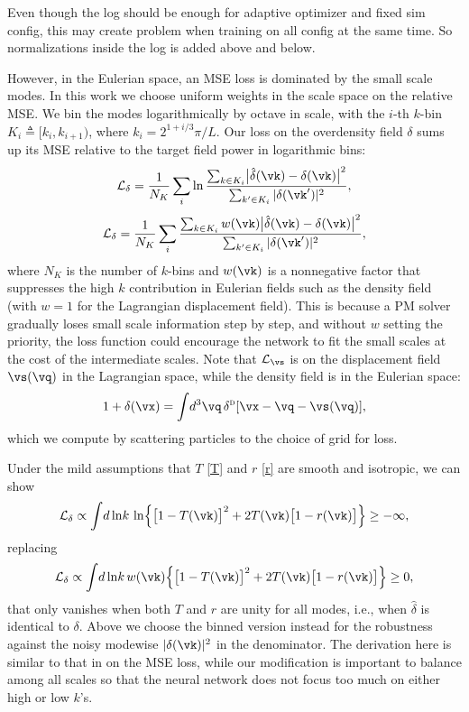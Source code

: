 \documentclass[modern, trackchanges, dvipsnames]{aastex631}
\newcommand{\deltaD}{\delta^\textsc{d}}
\renewcommand{\d}{d}
\newcommand{\cL}{\mathcal{L}}
\newcommand{\YL}[1]{\textcolor{Bittersweet}{#1}}
\begin{document}
\YL{Even though the log should be enough for adaptive optimizer and
fixed sim config, this may create problem when training on all config at
the same time. So normalizations inside the log is added above and
below.}

However, in the Eulerian space, an MSE loss is dominated by the small
scale modes.
In this work we choose uniform weights in the scale space on the
relative MSE.
We bin the modes logarithmically by  octave in scale, with
the $i$-th $k$-bin $K_i \triangleq [k_i, k_{i+1})$, where $k_i =
2^{1+i/3} \pi / L$.
Our loss on the overdensity field $\delta$ sums up its MSE relative to
the target field power in logarithmic bins:
%
\begin{equation}
\cL_\delta = \frac1{N_K} \sum_i \ln
\frac{\sum_{k \in K_i} \bigl| \hat\delta(\vk) - \delta(\vk) \bigr|^2}
     {\sum_{k' \in K_i} |\delta(\vk')|^2},
\end{equation}
%
\begin{equation}
\cL_\delta = \frac1{N_K} \sum_i
\frac{\sum_{k \in K_i} w(\vk)
      \bigl| \hat\delta(\vk) - \delta(\vk) \bigr|^2}
     {\sum_{k' \in K_i} |\delta(\vk')|^2},
\end{equation}
%
where $N_K$ is the number of $k$-bins and $w(\vk)$ is a nonnegative
factor that suppresses the high $k$ contribution in Eulerian fields such
as the density field (with $w=1$ for the Lagrangian displacement field).
This is because a PM solver gradually loses small scale information step
by step, and without $w$ setting the priority, the loss function could
encourage the network to fit the small scales at the cost of the
intermediate scales.
Note that $\cL_\vs$ is on the displacement field $\vs(\vq)$ in the
Lagrangian space, while the density field is in the Eulerian space:
%
\begin{equation}
1 + \delta(\vx) = \int\!\d^3\vq\, \deltaD[ \vx - \vq - \vs(\vq)],
\end{equation}
%
which we compute by scattering particles to the choice of grid for loss.

Under the mild assumptions that $T$ \eqref{T} and $r$ \eqref{r} are smooth
and isotropic, we can show
%
\begin{equation}
\cL_\delta \propto \int \!\d\ln\!k\, \ln
\Bigl\{ \bigl[ 1 - T(\vk) \bigr]^2
  + 2 T(\vk) \bigl[ 1 - r(\vk) \bigr] \Bigr\} \geq -\infty,
\end{equation}
%
replacing
%
\begin{equation}
\cL_\delta \propto \int \!\d\ln\!k\, w(\vk)
\Bigl\{ \bigl[ 1 - T(\vk) \bigr]^2
  + 2 T(\vk) \bigl[ 1 - r(\vk) \bigr] \Bigr\} \geq 0,
\end{equation}
%
that only vanishes when both $T$ and $r$ are unity for all modes, i.e.,
when $\hat\delta$ is identical to $\delta$.
Above we choose the binned version instead for the robustness against
the noisy modewise $|\delta(\vk)|^2$ in the denominator.
The derivation here is similar to that in \citet{HeEtAl2019} on the MSE
loss, while our modification is important to balance among all scales so
that the neural network does not focus too much on either high or low
$k$'s.
\end{document}
